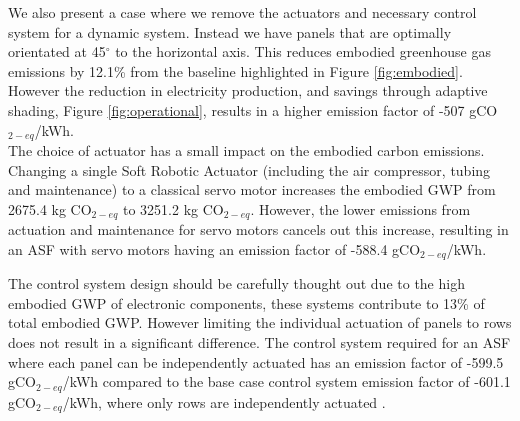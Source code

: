 We also present a case where we remove the actuators and necessary control system for a dynamic system. Instead we have panels that are optimally orientated at 45$^{\circ}$ to the horizontal axis. This reduces embodied greenhouse gas emissions by 12.1\% from the baseline highlighted in Figure \ref{fig:embodied}. However the reduction in electricity production, and savings through adaptive shading, Figure \ref{fig:operational}, results in a higher emission factor of -507 gCO$_{2-eq}$/kWh.\\

The choice of actuator has a small impact on the embodied carbon emissions. Changing a single Soft Robotic Actuator (including the air compressor, tubing and maintenance) to a classical servo motor increases the embodied GWP from 2675.4 kg CO$_{2-eq}$ to 3251.2 kg CO$_{2-eq}$. However, the lower emissions from actuation and maintenance for servo motors cancels out this increase, resulting in an ASF with servo motors having an emission factor of -588.4 gCO$_{2-eq}$/kWh.

The control system design should be carefully thought out due to the high embodied GWP of electronic components, these systems contribute to 13\% of total embodied GWP. However limiting the individual actuation of panels to rows does not result in a significant difference. The control system required for an ASF where each panel can be independently actuated has an emission factor of -599.5 gCO$_{2-eq}$/kWh compared to the base case control system emission factor of -601.1 gCO$_{2-eq}$/kWh, where only rows are independently actuated .\\



